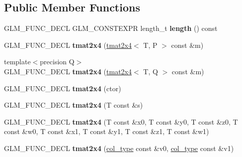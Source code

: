 \subsection*{Public Member Functions}
\begin{DoxyCompactItemize}
\item 
G\+L\+M\+\_\+\+F\+U\+N\+C\+\_\+\+D\+E\+CL G\+L\+M\+\_\+\+C\+O\+N\+S\+T\+E\+X\+PR length\+\_\+t {\bfseries length} () const \hypertarget{structglm_1_1detail_1_1tmat2x4_a3db525cbb29b4356a96d2d28489153fb}{}\label{structglm_1_1detail_1_1tmat2x4_a3db525cbb29b4356a96d2d28489153fb}

\item 
G\+L\+M\+\_\+\+F\+U\+N\+C\+\_\+\+D\+E\+CL {\bfseries tmat2x4} (\hyperlink{structglm_1_1detail_1_1tmat2x4}{tmat2x4}$<$ T, P $>$ const \&m)\hypertarget{structglm_1_1detail_1_1tmat2x4_a2246d953fc5f0c2024b887d1a4c83a06}{}\label{structglm_1_1detail_1_1tmat2x4_a2246d953fc5f0c2024b887d1a4c83a06}

\item 
{\footnotesize template$<$precision Q$>$ }\\G\+L\+M\+\_\+\+F\+U\+N\+C\+\_\+\+D\+E\+CL {\bfseries tmat2x4} (\hyperlink{structglm_1_1detail_1_1tmat2x4}{tmat2x4}$<$ T, Q $>$ const \&m)\hypertarget{structglm_1_1detail_1_1tmat2x4_a6abbbe035dd18771e08fc4e8e25aa043}{}\label{structglm_1_1detail_1_1tmat2x4_a6abbbe035dd18771e08fc4e8e25aa043}

\item 
G\+L\+M\+\_\+\+F\+U\+N\+C\+\_\+\+D\+E\+CL {\bfseries tmat2x4} (ctor)\hypertarget{structglm_1_1detail_1_1tmat2x4_ad3a92b19fec6109e97262c6e43699ee9}{}\label{structglm_1_1detail_1_1tmat2x4_ad3a92b19fec6109e97262c6e43699ee9}

\item 
G\+L\+M\+\_\+\+F\+U\+N\+C\+\_\+\+D\+E\+CL {\bfseries tmat2x4} (T const \&s)\hypertarget{structglm_1_1detail_1_1tmat2x4_a3226371920e32b8cc562b6325f19d0f5}{}\label{structglm_1_1detail_1_1tmat2x4_a3226371920e32b8cc562b6325f19d0f5}

\item 
G\+L\+M\+\_\+\+F\+U\+N\+C\+\_\+\+D\+E\+CL {\bfseries tmat2x4} (T const \&x0, T const \&y0, T const \&z0, T const \&w0, T const \&x1, T const \&y1, T const \&z1, T const \&w1)\hypertarget{structglm_1_1detail_1_1tmat2x4_abc1d0f89ff3055acdb275ef0ef3904bd}{}\label{structglm_1_1detail_1_1tmat2x4_abc1d0f89ff3055acdb275ef0ef3904bd}

\item 
G\+L\+M\+\_\+\+F\+U\+N\+C\+\_\+\+D\+E\+CL {\bfseries tmat2x4} (\hyperlink{structglm_1_1detail_1_1tvec4}{col\+\_\+type} const \&v0, \hyperlink{structglm_1_1detail_1_1tvec4}{col\+\_\+type} const \&v1)\hypertarget{structglm_1_1detail_1_1tmat2x4_ab0203c409f15c920754cb7ee35bb387c}{}\label{structglm_1_1detail_1_1tmat2x4_ab0203c409f15c920754cb7ee35bb387c}


\end{DoxyCompactItemize}
